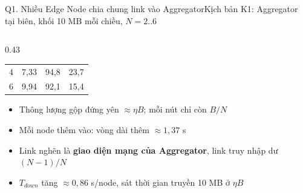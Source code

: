 \documentclass[aspectratio=169,10pt]{beamer}
\begin{document}
\begin{frame}{Q1. Nhiều Edge Node chia chung link vào Aggregator}{Kịch bản K1: Aggregator tại biên, khối 10 MB mỗi chiều, $N = 2..6$}
\begin{columns}[c]
\begin{column}{0.43\textwidth}
\begin{tabular}{c c c c}
        4 & 7,33 & 94,8 & 23,7 \\
        6 & 9,94 & 92,1 & 15,4 \\
        \bottomrule
      \end{tabular}
      \vspace{4pt}
      \begin{itemize}\footnotesize
        \item Thông lượng gộp đứng yên $\approx \eta B$; mỗi nút chỉ còn $B/N$
        \item Mỗi node thêm vào: vòng dài thêm $\approx 1{,}37$ s
        \item Link nghẽn là \textbf{giao diện mạng của Aggregator}, link truy nhập dư $(N-1)/N$
        \item $T_{down}$ tăng $\approx 0{,}86$ s/node, sát thời gian truyền 10 MB ở $\eta B$
      \end{itemize}
    \end{column}
  \end{columns}
\end{frame}
\end{document}
